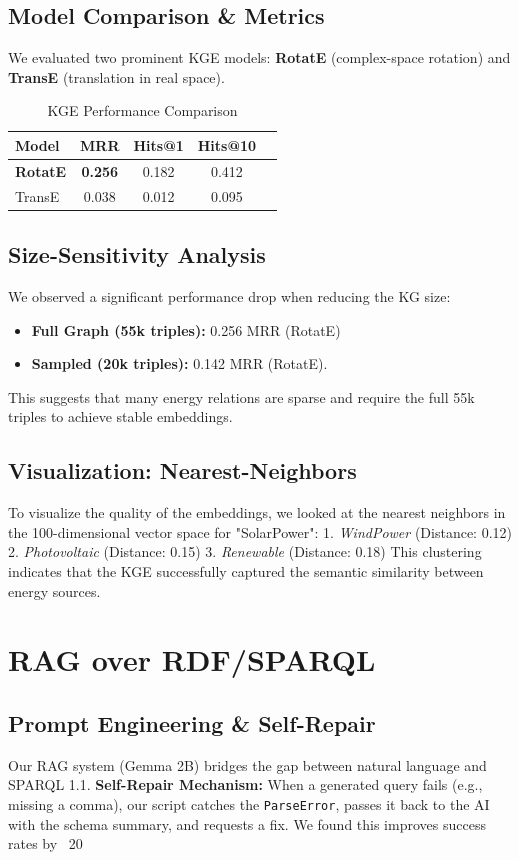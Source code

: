 \documentclass[11pt,a4paper]{article}
\begin{document}
\subsection{Model Comparison \& Metrics}
We evaluated two prominent KGE models: \textbf{RotatE} (complex-space rotation) and \textbf{TransE} (translation in real space).
\begin{table}[h]
\centering
\begin{tabular}{lcccc}
\toprule
Model & MRR & Hits@1 & Hits@10 \\
\midrule
\textbf{RotatE} & \textbf{0.256} & 0.182 & 0.412 \\
TransE & 0.038 & 0.012 & 0.095 \\
\bottomrule
\end{tabular}
\caption{KGE Performance Comparison}
\end{table}

\subsection{Size-Sensitivity Analysis}
We observed a significant performance drop when reducing the KG size:
\begin{itemize}
    \item \textbf{Full Graph (55k triples):} 0.256 MRR (RotatE)
    \item \textbf{Sampled (20k triples):} 0.142 MRR (RotatE).
\end{itemize}
This suggests that many energy relations are sparse and require the full 55k triples to achieve stable embeddings.

\subsection{Visualization: Nearest-Neighbors}
To visualize the quality of the embeddings, we looked at the nearest neighbors in the 100-dimensional vector space for "SolarPower":
1. \textit{WindPower} (Distance: 0.12)
2. \textit{Photovoltaic} (Distance: 0.15)
3. \textit{Renewable} (Distance: 0.18)
This clustering indicates that the KGE successfully captured the semantic similarity between energy sources.

\section{RAG over RDF/SPARQL}
\subsection{Prompt Engineering \& Self-Repair}
Our RAG system (Gemma 2B) bridges the gap between natural language and SPARQL 1.1.
\textbf{Self-Repair Mechanism:} When a generated query fails (e.g., missing a comma), our script catches the \texttt{ParseError}, passes it back to the AI with the schema summary, and requests a fix. We found this improves success rates by ~20%
\end{document}
